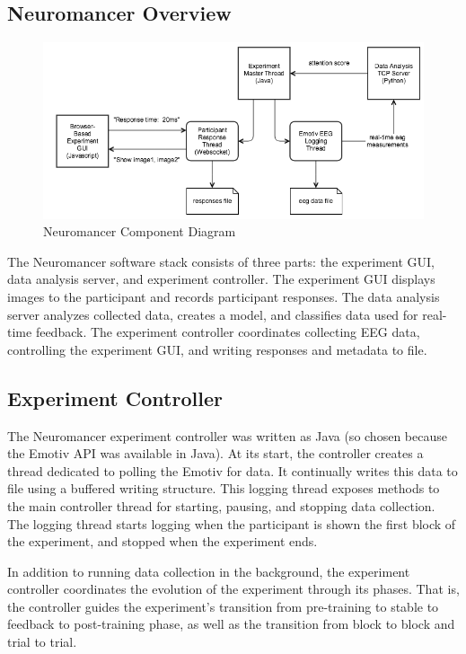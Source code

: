 \documentclass[12pt]{report}
\begin{document}
\subsection{Neuromancer Overview}
\begin{figure}
\centerline{
\includegraphics[width=12cm]{neuromancer_anatomy}
}
\caption{Neuromancer Component Diagram}
\end{figure}

The Neuromancer software stack consists of three parts: the experiment GUI, data analysis server, and experiment controller.  The experiment GUI displays images to the participant and records participant responses.  The data analysis server analyzes collected data, creates a model, and classifies data used for real-time feedback.  The experiment controller coordinates collecting EEG data, controlling the experiment GUI, and writing responses and metadata to file.

\subsection{Experiment Controller}
The Neuromancer experiment controller was written as Java (so chosen because the Emotiv API was available in Java).  At its start, the controller creates a thread dedicated to polling the Emotiv for data.  It continually writes this data to file using a buffered writing structure.  This logging thread exposes methods to the main controller thread for starting, pausing, and stopping data collection.  The logging thread starts logging when the participant is shown the first block of the experiment, and stopped when the experiment ends.
  
In addition to running data collection in the background, the experiment controller coordinates the evolution of the experiment through its phases. That is, the controller guides the experiment's transition from pre-training to stable to feedback to post-training phase, as well as the transition from block to block and trial to trial.   
\end{document}
